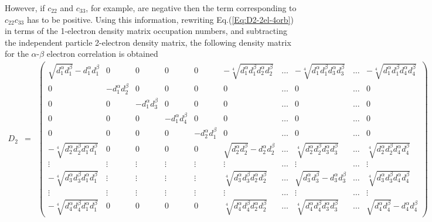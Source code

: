 \documentclass{amsart}
\begin{document}
\begin{itemize}
         However, if $c_{22}$ and $c_{33}$, for example, are negative then the term corresponding to
         $c_{22}c_{33}$ has to be positive. Using this information, rewriting Eq.(\ref{Eq:D2-2el-4orb}) in terms of 
         the 1-electron density matrix occupation numbers, and subtracting the independent particle 2-electron density
         matrix, the following density matrix for the $\alpha$-$\beta$ electron correlation is obtained
         \newcommand{\da}[1]{d_{#1}^\alpha}
         \newcommand{\db}[1]{d_{#1}^\beta}
         \tiny
         \begin{eqnarray}
         \label{Eq:Ecorrelation-2el-4orb}
         D_{2} &=&
         \begin{pmatrix}
         \sqrt{\da{1}\db{1}} -  \da{1}\db{1} & 0 & 0 & 0 & 0 & -\sqrt[4]{\da{1}\db{1}\da{2}\db{2}} & \ldots & -\sqrt[4]{\da{1}\db{1}\da{3}\db{3}} & \ldots & -\sqrt[4]{\da{1}\db{1}\da{4}\db{4}}  \\
         0 & -\da{1}\db{2} & 0 & 0 &  0 & 0 & \ldots & 0 & \ldots & 0 \\
         0 & 0 & -\da{1}\db{3} & 0 &  0 & 0 & \ldots & 0 & \ldots & 0 \\
         0 & 0 & 0 & -\da{1}\db{4} &  0 & 0 & \ldots & 0 & \ldots & 0 \\
         0 & 0 & 0 & 0 &  -\da{2}\db{1} & 0 & \ldots & 0 & \ldots & 0 \\
         -\sqrt[4]{\da{2}\db{2}\da{1}\db{1}}  & 0 & 0 & 0 & 0 & \sqrt{\da{2}\db{2}} -  \da{2}\db{2}  & \ldots & \sqrt[4]{\da{2}\db{2}\da{3}\db{3}} & \ldots & \sqrt[4]{\da{2}\db{2}\da{4}\db{4}} \\
         \vdots & \vdots & \vdots & \vdots &  \vdots & \vdots & \ldots & \vdots & \ldots & \vdots \\
         -\sqrt[4]{\da{3}\db{3}\da{1}\db{1}} & \vdots & \vdots & \vdots &  \vdots & \sqrt[4]{\da{3}\db{3}\da{2}\db{2}} & \ldots & \sqrt{\da{3}\db{3}} -  \da{3}\db{3}  & \ldots & \sqrt[4]{\da{3}\db{3}\da{4}\db{4}} \\
         \vdots & \vdots & \vdots & \vdots &  \vdots & \vdots & \ldots & \vdots & \ldots & \vdots \\
         -\sqrt[4]{\da{4}\db{4}\da{1}\db{1}} & 0 & 0 & 0 & 0 & \sqrt[4]{\da{4}\db{4}\da{2}\db{2}} & \ldots & \sqrt[4]{\da{4}\db{4}\da{3}\db{3}} & \ldots& \sqrt{\da{4}\db{4}} -  \da{4}\db{4} 
         \end{pmatrix}
         \end{eqnarray}
         \normalsize
\end{itemize}
\end{document}
